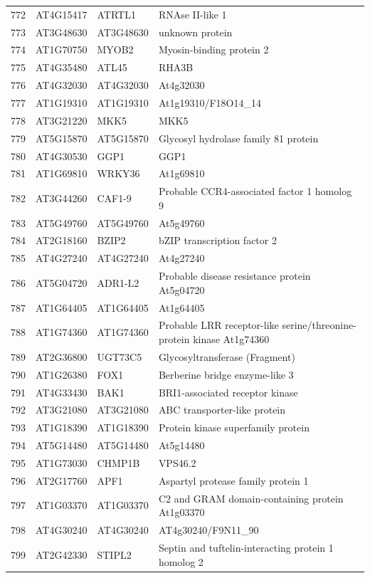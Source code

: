 \documentclass[11pt]{article}
\begin{document}
\begin{center}
\begin{tabular}{rlll}
772 & AT4G15417 & ATRTL1 & RNAse II-like 1\\
773 & AT3G48630 & AT3G48630 & unknown protein\\
774 & AT1G70750 & MYOB2 & Myosin-binding protein 2\\
775 & AT4G35480 & ATL45 & RHA3B\\
776 & AT4G32030 & AT4G32030 & At4g32030\\
777 & AT1G19310 & AT1G19310 & At1g19310/F18O14\_14\\
778 & AT3G21220 & MKK5 & MKK5\\
779 & AT5G15870 & AT5G15870 & Glycosyl hydrolase family 81 protein\\
780 & AT4G30530 & GGP1 & GGP1\\
781 & AT1G69810 & WRKY36 & At1g69810\\
782 & AT3G44260 & CAF1-9 & Probable CCR4-associated factor 1 homolog 9\\
783 & AT5G49760 & AT5G49760 & At5g49760\\
784 & AT2G18160 & BZIP2 & bZIP transcription factor 2\\
785 & AT4G27240 & AT4G27240 & At4g27240\\
786 & AT5G04720 & ADR1-L2 & Probable disease resistance protein At5g04720\\
787 & AT1G64405 & AT1G64405 & At1g64405\\
788 & AT1G74360 & AT1G74360 & Probable LRR receptor-like serine/threonine-protein kinase At1g74360\\
789 & AT2G36800 & UGT73C5 & Glycosyltransferase (Fragment)\\
790 & AT1G26380 & FOX1 & Berberine bridge enzyme-like 3\\
791 & AT4G33430 & BAK1 & BRI1-associated receptor kinase\\
792 & AT3G21080 & AT3G21080 & ABC transporter-like protein\\
793 & AT1G18390 & AT1G18390 & Protein kinase superfamily protein\\
794 & AT5G14480 & AT5G14480 & At5g14480\\
795 & AT1G73030 & CHMP1B & VPS46.2\\
796 & AT2G17760 & APF1 & Aspartyl protease family protein 1\\
797 & AT1G03370 & AT1G03370 & C2 and GRAM domain-containing protein At1g03370\\
798 & AT4G30240 & AT4G30240 & AT4g30240/F9N11\_90\\
799 & AT2G42330 & STIPL2 & Septin and tuftelin-interacting protein 1 homolog 2\\

\end{tabular}
\end{center}
\end{document}

